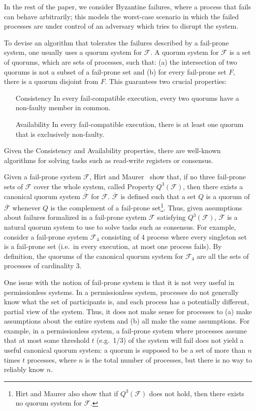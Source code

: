 \documentclass[11pt]{article}
\begin{document}
In the rest of the paper, we consider Byzantine failures, where a process that fails can behave arbitrarily; this models the worst-case scenario in which the failed processes are under control of an adversary which tries to disrupt the system.

To devise an algorithm that tolerates the failures described by a fail-prone system, one usually uses a quorum system for $\mathcal{F}$.
A quorum system for $\mathcal{F}$ is a set of quorums, which are sets of processes, such that: (a) the intersection of two quorums is not a subset of a fail-prone set and (b) for every fail-prone set $F$, there is a quorum disjoint from $F$.
This guarantees two crucial properties:
\begin{itemize}
  \item[Consistency] In every fail-compatible execution, every two quorums have a non-faulty member in common.
  \item[Availability] In every fail-compatible execution, there is at least one quorum that is exclusively non-faulty.
\end{itemize}
Given the Consistency and Availability properties, there are well-known algorithms for solving tasks such as read-write registers or consensus.

Given a fail-prone system $\mathcal{F}$, Hirt and Maurer~\cite{hirtPlayerSimulationGeneral2000} show that, if no three fail-prone sets of $\mathcal{F}$ cover the whole system, called Property $Q^3(\mathcal{F})$, then there exists a canonical quorum system $\overline{\mathcal{F}}$ for $\mathcal{F}$.
$\overline{\mathcal{F}}$ is defined such that a set $Q$ is a quorum of $\overline{\mathcal{F}}$ whenever $Q$ is the complement of a fail-prone set\footnote{Hirt and Maurer also show that if $Q^3(\mathcal{F})$ does not hold, then there exists no quorum system for $\mathcal{F}$.}.
Thus, given assumptions about failures formalized in a fail-prone system $\mathcal{F}$ satisfying $Q^3\left(\mathcal{F}\right)$, $\overline{\mathcal{F}}$ is a natural quorum system to use to solve tasks such as consensus.
For example, consider a fail-prone system $\mathcal{F}_4$ consisting of 4 process where every singleton set is a fail-prone set (i.e.\ in every execution, at most one process fails).
By definition, the quorums of the canonical quorum system for $\mathcal{F}_4$ are all the sets of processes of cardinality 3.

One issue with the notion of fail-prone system is that it is not very useful in permissionless systems.
In a permissionless system, processes do not generally know what the set of participants is, and each process has a potentially different, partial view of the system.
Thus, it does not make sense for processes to (a) make assumptions about the entire system and (b) all make the same assumptions.
For example, in a permissionless system, a fail-prone system where processes assume that at most some threshold $t$ (e.g.\ 1/3) of the system will fail does not yield a useful canonical quorum system: a quorum is supposed to be a set of more than $n$ times $t$ processes, where $n$ is the total number of processes, but there is no way to reliably know $n$.
\end{document}
